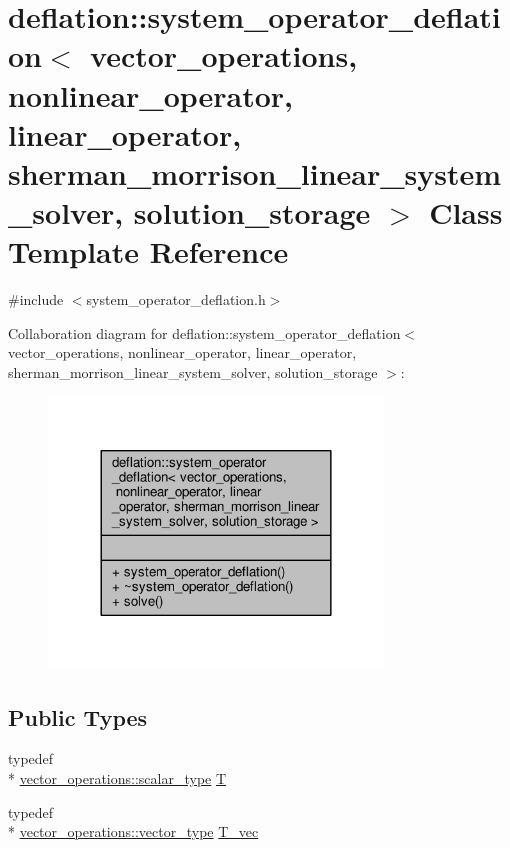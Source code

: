 \hypertarget{classdeflation_1_1system__operator__deflation}{\section{deflation\-:\-:system\-\_\-operator\-\_\-deflation$<$ vector\-\_\-operations, nonlinear\-\_\-operator, linear\-\_\-operator, sherman\-\_\-morrison\-\_\-linear\-\_\-system\-\_\-solver, solution\-\_\-storage $>$ Class Template Reference}
\label{classdeflation_1_1system__operator__deflation}
}


{\ttfamily \#include $<$system\-\_\-operator\-\_\-deflation.\-h$>$}



Collaboration diagram for deflation\-:\-:system\-\_\-operator\-\_\-deflation$<$ vector\-\_\-operations, nonlinear\-\_\-operator, linear\-\_\-operator, sherman\-\_\-morrison\-\_\-linear\-\_\-system\-\_\-solver, solution\-\_\-storage $>$\-:
\nopagebreak
\begin{figure}[H]
\begin{center}
\leavevmode
\includegraphics[width=252pt]{classdeflation_1_1system__operator__deflation__coll__graph}
\end{center}
\end{figure}
\subsection*{Public Types}
\begin{DoxyCompactItemize}
\item 
typedef \\*
\hyperlink{structcpu__vector__operations_aca6b216aa1fb172df83d98350e94fd61}{vector\-\_\-operations\-::scalar\-\_\-type} \hyperlink{classdeflation_1_1system__operator__deflation_ac9c012537cdfa0be8c8ebda025dd71ba}{T}
\item 
typedef \\*
\hyperlink{structcpu__vector__operations_a1962836df596ce262704d208e9a6d8f9}{vector\-\_\-operations\-::vector\-\_\-type} \hyperlink{classdeflation_1_1system__operator__deflation_a049936d7a4abda90adcccdc8ff56e186}{T\-\_\-vec}
\end{DoxyCompactItemize}
